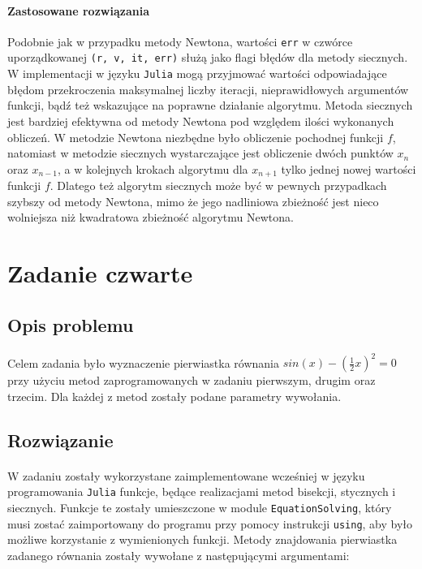 \documentclass[a4paper]{article}
\begin{document}
\paragraph{Zastosowane rozwiązania}
Podobnie jak w przypadku metody Newtona, wartości \texttt{err} w czwórce uporządkowanej \texttt{(r, v, it, err)} służą jako flagi błędów dla metody siecznych. W implementacji w języku \texttt{Julia} mogą przyjmować wartości odpowiadające błędom przekroczenia maksymalnej liczby iteracji, nieprawidłowych argumentów funkcji, bądź też wskazujące na poprawne działanie algorytmu. Metoda siecznych jest bardziej efektywna od metody Newtona pod względem ilości wykonanych obliczeń. W metodzie Newtona niezbędne było obliczenie pochodnej funkcji $f$, natomiast w metodzie siecznych wystarczające jest obliczenie dwóch punktów $x_{n}$ oraz $x_{n-1}$, a w kolejnych krokach algorytmu dla $x_{n+1}$ tylko jednej nowej wartości funkcji $f$. Dlatego też algorytm siecznych może być w pewnych przypadkach szybszy od metody Newtona, mimo że jego nadliniowa zbieżność jest nieco wolniejsza niż kwadratowa zbieżność algorytmu Newtona.

\section{Zadanie czwarte}

\subsection{Opis problemu}
\paragraph{}
Celem zadania było wyznaczenie pierwiastka równania $sin(x) - (\frac{1}{2}x)^2 = 0$ przy użyciu metod zaprogramowanych w zadaniu pierwszym, drugim oraz trzecim. Dla każdej z metod zostały podane parametry wywołania.

\subsection{Rozwiązanie}
\paragraph{}
W zadaniu zostały wykorzystane zaimplementowane wcześniej w języku programowania \texttt{Julia} funkcje, będące realizacjami metod bisekcji, stycznych i siecznych. Funkcje te zostały umieszczone w module \texttt{EquationSolving}, który musi zostać zaimportowany do programu przy pomocy instrukcji \texttt{using}, aby było możliwe korzystanie z wymienionych funkcji. Metody znajdowania pierwiastka zadanego równania zostały wywołane z następującymi argumentami:
\end{document}

